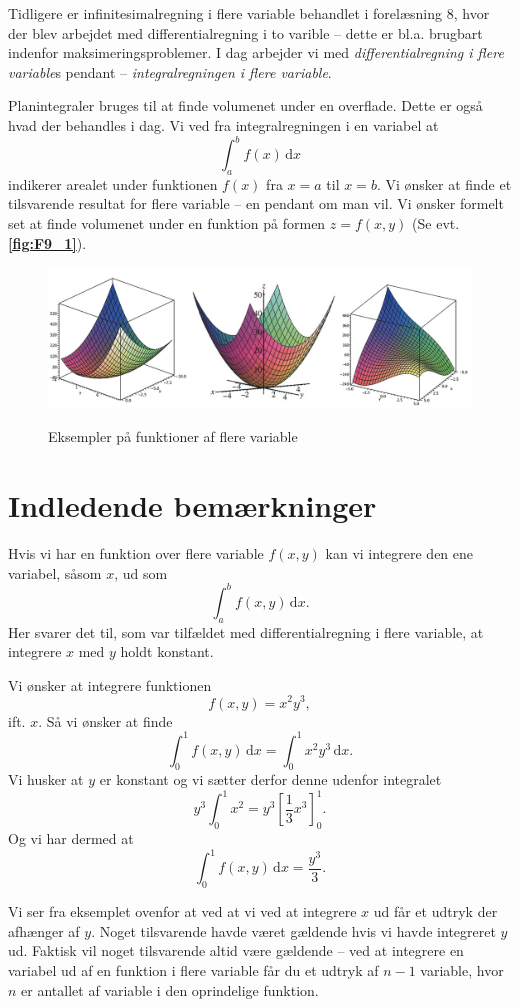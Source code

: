 Tidligere er infinitesimalregning i flere variable behandlet i forelæsning 8, hvor der blev arbejdet med differentialregning i to varible -- dette er bl.a. brugbart indenfor maksimeringsproblemer. I dag arbejder vi med \emph{differentialregning i flere variable}s pendant -- \emph{integralregningen i flere variable}.

Planintegraler bruges til at finde volumenet under en overflade. Dette er også hvad der behandles i dag. Vi ved fra integralregningen i en variabel at
\[ 
\int_{a}^{b} f(x) \, \mathrm{d}x 
\]
indikerer arealet under funktionen $f(x)$ fra $x = a$ til $x = b$. Vi ønsker at finde et tilsvarende resultat for flere variable -- en pendant om man vil. Vi ønsker formelt set at finde volumenet under en funktion på formen $z = f(x,y)$ (Se evt. \textbf{\autoref{fig:F9_1}}). 

\begin{figure} [ht]
  \centering
  \caption{Eksempler på funktioner af flere variable}
  \includegraphics[width=0.5\linewidth]{./figures/F9_1.png}
  \label{fig:F9_1}
\end{figure}

\section{Indledende bemærkninger}
Hvis vi har en funktion over flere variable $f(x,y)$ kan vi integrere den ene variabel, såsom $x$, ud som
\[ 
\int_{a}^{b} f(x,y) \, \mathrm{d}x 
.\]
Her svarer det til, som var tilfældet med differentialregning i flere variable, at integrere $x$ med $y$ holdt konstant.

\begin{eks}
  Vi ønsker at integrere funktionen
  \[ 
  f(x,y) = x^2y^3
  ,\]
  ift. $x$. Så vi ønsker at finde
  \[ 
  \int_{0}^{1} f(x,y) \, \mathrm{d}x = \int_{0}^{1} x^2y^3 \, \mathrm{d}x 
  .\]
  Vi husker at $y$ er konstant og vi sætter derfor denne udenfor integralet
  \[ 
    y^3 \int_{0}^{1} x^2 = y^3 \left[ \frac{1}{3}x^3 \right]_0^1
  .\]
  Og vi har dermed at
  \[ 
  \int_{0}^{1} f(x,y) \, \mathrm{d}x = \frac{y^3}{3}
  .\]
\end{eks}
Vi ser fra eksemplet ovenfor at ved at vi ved at integrere $x$ ud får et udtryk der afhænger af $y$. Noget tilsvarende havde været gældende hvis vi havde integreret $y$ ud. Faktisk vil noget tilsvarende altid være gældende -- ved at integrere en variabel ud af en funktion i flere variable får du et udtryk af $n-1$ variable, hvor $n$ er antallet af variable i den oprindelige funktion.


